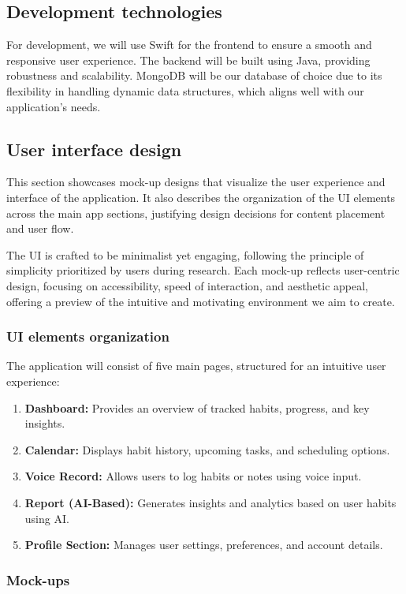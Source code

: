 \documentclass{article}
\begin{document}
\subsection{Development technologies}

For development, we will use Swift for the frontend to ensure a smooth and responsive user experience. The backend will be built using Java, providing robustness and scalability. 
MongoDB will be our database of choice due to its flexibility in handling dynamic data structures, which aligns well with our application's needs.
\subsection{User interface design}

This section showcases mock-up designs that visualize the user experience and interface of the application.
It also describes the organization of the UI elements across the main app sections, justifying design decisions for content placement and user flow.

The UI is crafted to be minimalist yet engaging, following the principle of simplicity prioritized by users during research.
Each mock-up reflects user-centric design, focusing on accessibility, speed of interaction, and aesthetic appeal, offering a preview of the intuitive and motivating environment we aim to create.

\subsubsection{UI elements organization}

The application will consist of five main pages, structured for an intuitive user experience:

\begin{enumerate}
    \item \textbf{Dashboard:} Provides an overview of tracked habits, progress, and key insights.
    \item \textbf{Calendar:} Displays habit history, upcoming tasks, and scheduling options.
    \item \textbf{Voice Record:} Allows users to log habits or notes using voice input.
    \item \textbf{Report (AI-Based):} Generates insights and analytics based on user habits using AI.
    \item \textbf{Profile Section:} Manages user settings, preferences, and account details.
\end{enumerate}

\subsubsection{Mock-ups}


\end{document}
